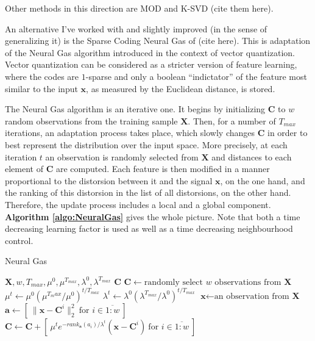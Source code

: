 \documentclass[12pt,a4paper,oneside,english]{UPBThesis}
\newcommand{\hcrange}[2]{\overline{{#1}\colon\!\!{#2}}}
\begin{document}
Other methods in this direction are MOD and K-SVD (cite them here).

An alternative I've worked with and slightly improved (in the sense of generalizing it) is the Sparse Coding Neural Gas of (cite here). This is adaptation of the Neural Gas algorithm introduced in the context of vector quantization. Vector quantization can be considered as a stricter version of feature learning, where the codes are $1$-sparse and only a boolean ``indictator'' of the feature most similar to the input $\textbf{x}$, as measured by the Euclidean distance, is stored.

The Neural Gas algorithm is an iterative one. It begins by initializing $\textbf{C}$ to $w$ random observations from the training sample $\textbf{X}$. Then, for a number of $T_{max}$ iterations, an adaptation process takes place, which slowly changes $\textbf{C}$ in order to best represent the distribution over the input space. More precisely, at each iteration $t$ an observation is randomly selected from $\textbf{X}$ and distances to each element of $\textbf{C}$ are computed. Each feature is then modified in a manner proportional to the distorsion between it and the signal $\textbf{x}$, on the one hand, and the ranking of this distorsion in the list of all distorsions, on the other hand. Therefore, the update process includes a local and a global component. \textbf{Algorithm \ref{algo:NeuralGas}} gives the whole picture. Note that both a time decreasing learning factor is used as well as a time decreasing neighbourhood control. 

\begin{algorithm}
\caption{Neural Gas}
\label{algo:NeuralGas}
\begin{algorithmic}
\Require $\textbf{X},w,T_{max},\mu^0,\mu^{T_{max}},\lambda^0,\lambda^{T_{max}}$
\Ensure $\textbf{C}$
\State $\textbf{C} \gets \mbox{randomly select $w$ observations from $\textbf{X}$}$
\For {$t = \hcrange{1}{T_{max}}$}
\State $\mu^t \gets \mu^0 (\mu^{T_max} / \mu^0)^{t / T_{max}}$ 
\State $\lambda^t \gets \lambda^0 (\lambda^{T_{max}} / \lambda^0)^{t / T_{max}}$ 
\State $\textbf{x} \gets \text{an observation from $\textbf{X}$}$
\State $\textbf{a} \gets [ ~ \|\textbf{x} - \textbf{C}^i\|_2^2 ~ \mbox{for $i \in \hcrange{1}{w}$} ~ ]$
\State $\textbf{C} \gets \textbf{C} + [ ~ \mu^t e^{-rank_{\textbf{a}}(a_i) / \lambda^t} (\textbf{x} - \textbf{C}^i) ~ \mbox{for $i \in \hcrange{1}{w}$} ~ ]$
\EndFor
\end{algorithmic}
\end{algorithm}
\end{document}
